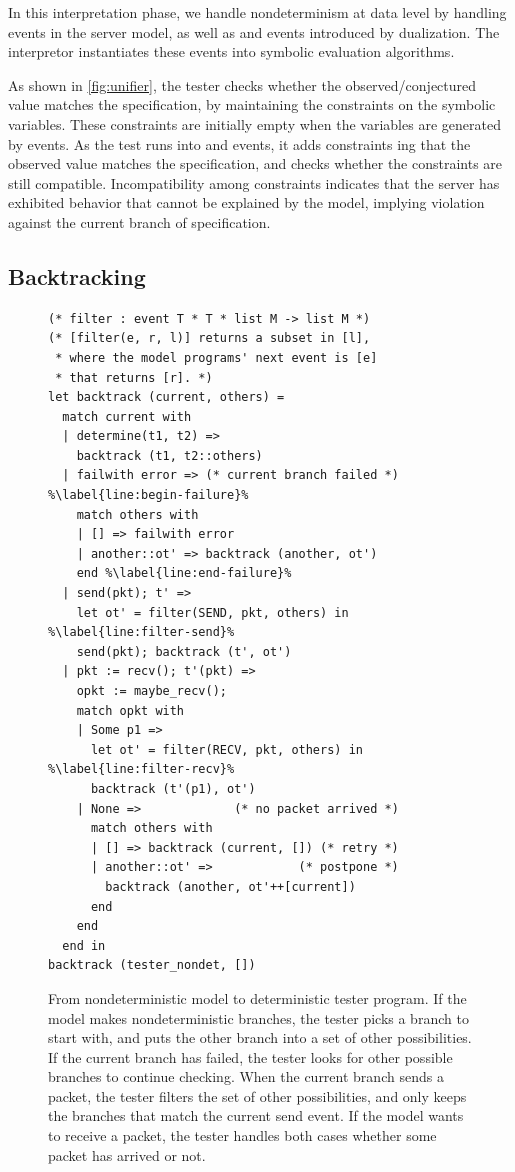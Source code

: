 In this interpretation phase, we handle nondeterminism at data level by handling
 events in the server model, as well as  and 
events introduced by dualization.  The interpretor instantiates these events
into symbolic evaluation algorithms.

As shown in \autoref{fig:unifier}, the tester checks whether the observed/conjectured
value matches the specification, by maintaining the constraints on the symbolic
variables.  These constraints are initially empty when the variables are
generated by  events.  As the test runs into  and
 events, it adds constraints ing that the observed value
matches the specification, and checks whether the constraints are still
compatible.  Incompatibility among constraints indicates that the server has
exhibited behavior that cannot be explained by the model, implying violation
against the current branch of specification.

\subsection{Backtracking}
\label{sec:backtracking}
\begin{figure}
  \begin{lstlisting}[style=customcoq,escapechar=\%]
(* filter : event T * T * list M -> list M *)
(* [filter(e, r, l)] returns a subset in [l],
 * where the model programs' next event is [e]
 * that returns [r]. *)
let backtrack (current, others) =
  match current with
  | determine(t1, t2) =>
    backtrack (t1, t2::others)
  | failwith error => (* current branch failed *) %\label{line:begin-failure}%
    match others with
    | [] => failwith error
    | another::ot' => backtrack (another, ot')
    end %\label{line:end-failure}%
  | send(pkt); t' =>
    let ot' = filter(SEND, pkt, others) in %\label{line:filter-send}%
    send(pkt); backtrack (t', ot')
  | pkt := recv(); t'(pkt) =>
    opkt := maybe_recv();
    match opkt with
    | Some p1 =>
      let ot' = filter(RECV, pkt, others) in %\label{line:filter-recv}%
      backtrack (t'(p1), ot')
    | None =>             (* no packet arrived *)
      match others with
      | [] => backtrack (current, []) (* retry *)
      | another::ot' =>            (* postpone *)
        backtrack (another, ot'++[current])
      end
    end
  end in
backtrack (tester_nondet, [])
  \end{lstlisting}
  \caption{From nondeterministic model to deterministic tester program.  If the
    model makes nondeterministic branches, the tester picks a branch to start
    with, and puts the other branch into a set of other possibilities.  If the
    current branch has failed, the tester looks for other possible branches to
    continue checking.  When the current branch sends a packet, the tester
    filters the set of other possibilities, and only keeps the branches that
    match the current send event.  If the model wants to receive a packet, the
    tester handles both cases whether some packet has arrived or not.}
  \label{fig:backtrack}
\end{figure}

